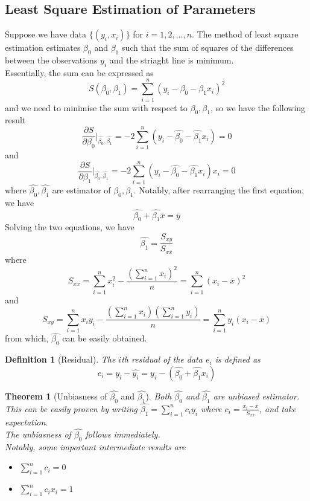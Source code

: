 \documentclass[11pt]{article}
\newtheorem{definition}{Definition}[section]
\newtheorem{theorem}{Theorem}[section]
\theoremstyle{definition}
\begin{document}
\subsection{Least Square Estimation of Parameters}
Suppose we have data $\{(y_i, x_i)\}$ for $i=1, 2, \ldots, n$. The method of least square estimation estimates $\beta_0$ and $\beta_1$ such that the sum of squares of the differences between the observations $y_i$ and the striaght line is minimum.\\
Essentially, the sum can be expressed as 
\[
S(\beta_0, \beta_1) = \sum_{i=1}^n (y_i-\beta_0-\beta_1x_i)^2
\]
and we need to minimise the sum with respect to $\beta_0, \beta_1$, so we have the following result
\[
\frac{\partial S}{\partial \beta_0}\rvert_{\hat{\beta_0}, \hat{\beta_1}} = -2\sum_{i=1}^n(y_i-\hat{\beta_0}-\hat{\beta_1}x_i) = 0
\]
and
\[
\frac{\partial S}{\partial \beta_1}\rvert_{\hat{\beta_0}, \hat{\beta_1}} = -2\sum_{i=1}^n(y_i-\hat{\beta_0}-\hat{\beta_1}x_i)x_i = 0
\]
where $\hat{\beta_0}, \hat{\beta_1}$ are estimator of $\beta_0, \beta_1$.
Notably, after rearranging the first equation, we have
\[
\hat{\beta_0} + \hat{\beta_1}\bar{x} = \bar{y}
\]
Solving the two equations, we have
\[
\hat{\beta_1} = \frac{S_{xy}}{S_{xx}}
\]
where 
\[
S_{xx} = \sum_{i=1}^n x_i^2 - \frac{\left(\sum_{i=1}^n x_i\right)^2}{n} = \sum_{i=1}^n (x_i-\bar{x})^2
\]
and 
\[
S_{xy} = \sum_{i=1}^n x_iy_i - \frac{\left(\sum_{i=1}^n x_i\right)\left(\sum_{i=1}^n y_i\right)}{n} = \sum_{i=1}^n y_i(x_i-\bar{x})
\]
from which, $\hat{\beta_0}$ can be easily obtained.\\
\begin{definition}[Residual]
\normalfont The $i$th residual of the data $e_i$ is defined as
\[
e_i = y_i-\hat{y_i} = y_i-(\hat{\beta_0}+\hat{\beta_1}x_i)
\]
\end{definition}
\begin{theorem}[Unbiasness of {$\hat{\beta_0}$} and {$\hat{\beta_1}$}]
\normalfont Both $\hat{\beta_0}$ and $\hat{\beta_1}$ are unbiased estimator.\\
This can be easily proven by writing $\hat{\beta_1} = \sum_{i=1}^n c_iy_i$ where $c_i=\frac{x_i-\bar{x}}{S_{xx}}$, and take expectation.\\
The unbiasness of $\hat{\beta_0}$ follows immediately.\\
Notably, some important intermediate results are
\begin{itemize}
  \item $\sum_{i=1}^n c_i = 0$
  \item $\sum_{i=1}^n c_ix_i = 1$
\end{itemize}
\end{theorem}
\end{document}
